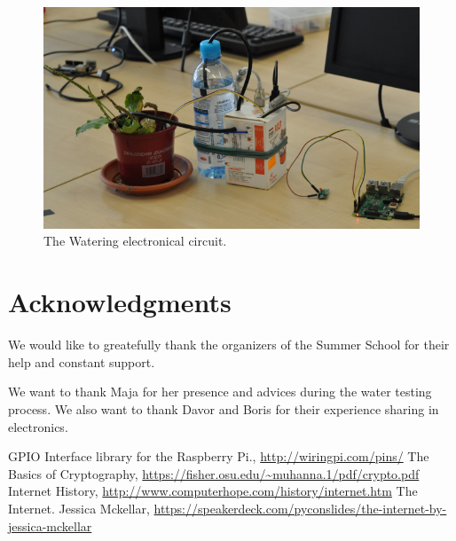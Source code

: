 \documentclass[conference]{IEEEtran}
\begin{document}
\begin{figure}
    \centering
    \includegraphics[width=\columnwidth]{final_box}
    \caption{The Watering electronical circuit.}
    \label{fig:final_box}
\end{figure}
\section*{Acknowledgments}


We would like to greatefully thank the organizers of the Summer School for their help and constant support.


We want to thank Maja for her presence and advices during the water testing process.
We also want to thank Davor and Boris for their experience sharing in electronics.



\begin{thebibliography}{10}
    GPIO Interface library for the Raspberry Pi.,
    \url{http://wiringpi.com/pins/}
    The Basics of Cryptography,
    \url{https://fisher.osu.edu/~muhanna.1/pdf/crypto.pdf}
    Internet History,
    \url{http://www.computerhope.com/history/internet.htm}
    The Internet. Jessica Mckellar,
    \url{https://speakerdeck.com/pyconslides/the-internet-by-jessica-mckellar}
\end{thebibliography}
\end{document}
